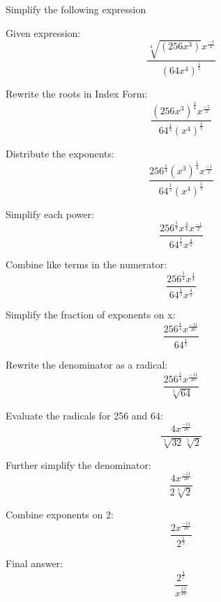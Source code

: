 \documentclass[a4paper]{tufte-handout}
\begin{document}
\begin{question}
\vspace{1.5cm}

\qpart
Simplify the following expression

Given expression:
	\[\frac{\sqrt[4]{(256x^3)}x^{\frac{-1}{2}}}{(64x^{4})^{\frac{1}{5}}}\]
	
Rewrite the roots in Index Form:
	\[\frac{(256x^{3})^{\frac{1}{4}}x^{\frac{-1}{2}}}{64^{\frac{1}{5}}(x^{4})^{\frac{1}{5}}}\]

Distribute the exponents:
	\[\frac{256^{\frac{1}{4}}(x^{3})^{\frac{1}{4}}x^{\frac{-1}{2}}}{64^{\frac{1}{5}}(x^{4})^{\frac{1}{5}}}\]
	
Simplify each power:
	\[\frac{256^{\frac{1}{4}}x^{\frac{3}{4}}x^{\frac{-1}{2}}}{64^{\frac{1}{5}}x^{\frac{4}{5}}}\]
	
Combine like terms in the numerator:
	\[\frac{256^{\frac{1}{4}}x^{\frac{1}{4}}}{64^{\frac{1}{5}}x^{\frac{4}{5}}}\]
	
Simplify the fraction of exponents on x:
	\[\frac{256^{\frac{1}{4}}x^{\frac{-11}{20}}}{64^{\frac{1}{5}}}\]

Rewrite the denominator as a radical: 
	\[\frac{256^{\frac{1}{4}}x^{\frac{-11}{20}}}{\sqrt[5]{64}}\]

Evaluate the radicals for 256 and 64:
	\[\frac{4x^{\frac{-11}{20}}}{\sqrt[5]{32}\sqrt[5]{2}}\]
	
Further simplify the denominator:
	\[\frac{4x^{\frac{-11}{20}}}{2\sqrt[5]{2}}\]
	
Combine exponents on 2:
	\[\frac{2x^{\frac{-11}{20}}}{2^{\frac{1}{5}}}\]

Final answer:
	\[\frac{2^{\frac{4}{5}}}{x^{\frac{11}{20}}}\]

\end{question}
\end{document}
